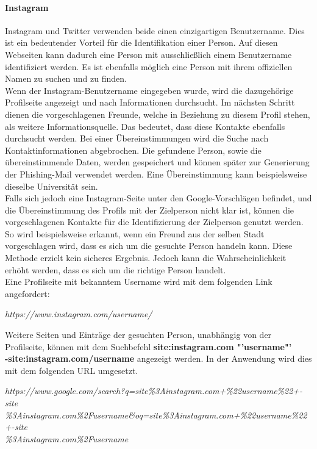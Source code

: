 			\paragraph{Instagram}
			Instagram und Twitter verwenden beide einen einzigartigen Benutzername. Dies ist ein bedeutender Vorteil für die Identifikation einer Person. Auf diesen Webseiten kann dadurch eine Person mit ausschließlich einem Benutzername identifiziert werden. Es ist ebenfalls möglich eine Person mit ihrem offiziellen Namen zu suchen und zu finden.\\
			Wenn der Instagram-Benutzername eingegeben wurde, wird die dazugehörige Profilseite angezeigt und nach Informationen durchsucht. Im nächsten Schritt dienen die vorgeschlagenen Freunde, welche in Beziehung zu diesem Profil stehen, als weitere Informationsquelle. Das bedeutet, dass diese Kontakte ebenfalls durchsucht werden. Bei einer Übereinstimmungen wird die Suche nach Kontaktinformationen abgebrochen. Die gefundene Person, sowie die übereinstimmende Daten, werden gespeichert und können später zur Generierung  der Phishing-Mail verwendet werden. Eine Übereinstimmung kann beispielsweise dieselbe Universität sein.\\
			Falls sich jedoch eine Instagram-Seite unter den Google-Vorschlägen befindet, und die Übereinstimmung des Profils mit der Zielperson nicht klar ist, können die vorgeschlagenen Kontakte für die Identifizierung der Zielperson genutzt werden. So wird beispielsweise erkannt, wenn ein Freund aus der selben Stadt vorgeschlagen wird, dass es sich um die gesuchte Person handeln kann. Diese Methode erzielt kein sicheres Ergebnis. Jedoch kann die Wahrscheinlichkeit erhöht werden, dass es sich um die richtige Person handelt.\\
			Eine Profilseite mit bekanntem Username  wird mit dem folgenden Link angefordert:
			
			\textit{https://www.instagram.com/username/}
			
			Weitere Seiten und Einträge der gesuchten Person, unabhängig von der Profilseite, können mit dem Suchbefehl \textbf{site:instagram.com "'username"' \\ -site:instagram.com/username} angezeigt werden. \cite{Bazzell} In der Anwendung wird dies mit dem folgenden URL umgesetzt.
					
			\textit{https://www.google.com/search?q=site\%3Ainstagram.com+\%22username\%22+-site\\
				\%3Ainstagram.com\%2Fusername\&oq=site\%3Ainstagram.com+\%22username\%22+-site\\
				\%3Ainstagram.com\%2Fusername}
			
